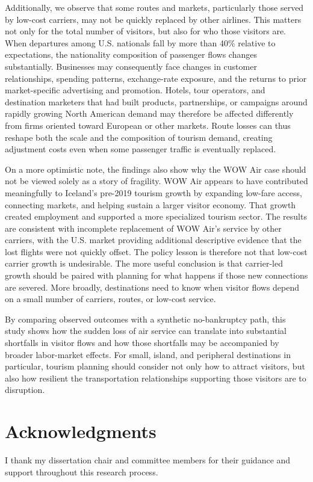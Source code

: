 \documentclass[12pt]{article}
\begin{document}
Additionally, we observe that some routes and markets, particularly those served by low-cost carriers, may not be quickly replaced by other airlines. This matters not only for the total number of visitors, but also for who those visitors are. When departures among U.S. nationals fall by more than 40\% relative to expectations, the nationality composition of passenger flows changes substantially. Businesses may consequently face changes in customer relationships, spending patterns, exchange-rate exposure, and the returns to prior market-specific advertising and promotion. Hotels, tour operators, and destination marketers that had built products, partnerships, or campaigns around rapidly growing North American demand may therefore be affected differently from firms oriented toward European or other markets. Route losses can thus reshape both the scale and the composition of tourism demand, creating adjustment costs even when some passenger traffic is eventually replaced.


On a more optimistic note, the findings also show why the WOW Air case should not be viewed solely as a story of fragility. WOW Air appears to have contributed meaningfully to Iceland's pre-2019 tourism growth by expanding low-fare access, connecting markets, and helping sustain a larger visitor economy. That growth created employment and supported a more specialized tourism sector. The results are consistent with incomplete replacement of WOW Air’s service by other carriers, with the U.S. market providing additional descriptive evidence that the lost flights were not quickly offset. The policy lesson is therefore not that low-cost carrier growth is undesirable. The more useful conclusion is that carrier-led growth should be paired with planning for what happens if those new connections are severed. More broadly, destinations need to know when visitor flows depend on a small number of carriers, routes, or low-cost service.

By comparing observed outcomes with a synthetic no-bankruptcy path, this study shows how the sudden loss of air service can translate into substantial shortfalls in visitor flows and how those shortfalls may be accompanied by broader labor-market effects. For small, island, and peripheral destinations in particular, tourism planning should consider not only how to attract visitors, but also how resilient the transportation relationships supporting those visitors are to disruption.

\section*{Acknowledgments}
I thank my dissertation chair and committee members for their guidance and support throughout this research process.
\end{document}
